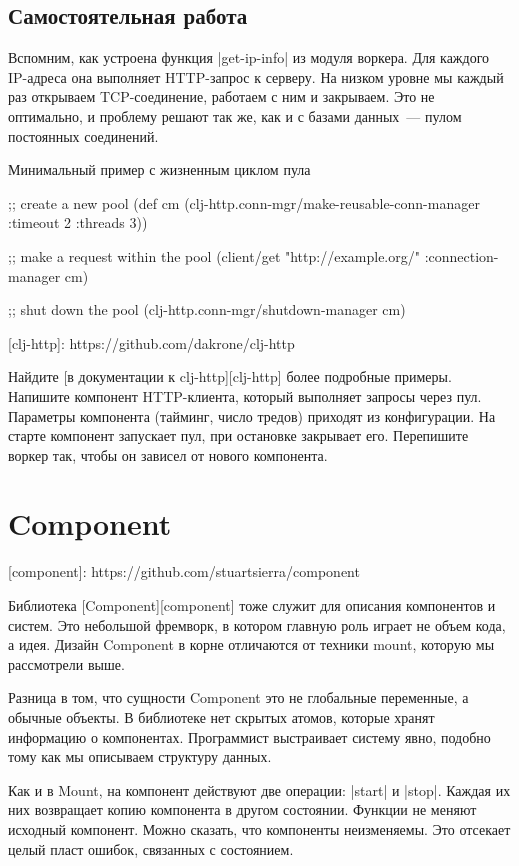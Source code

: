 \subsection{Самостоятельная работа}

Вспомним, как устроена функция \spverb|get-ip-info| из модуля воркера. Для каждого
IP-адреса она выполняет HTTP-запрос к серверу. На низком уровне мы каждый раз
открываем TCP-соединение, работаем с ним и закрываем. Это не оптимально, и
проблему решают так же, как и с базами данных~--- пулом постоянных соединений.

Минимальный пример с жизненным циклом пула

\begin{code}
;; create a new pool
(def cm (clj-http.conn-mgr/make-reusable-conn-manager
         {:timeout 2 :threads 3}))

;; make a request within the pool
(client/get "http://example.org/"
            {:connection-manager cm})

;; shut down the pool
(clj-http.conn-mgr/shutdown-manager cm)
\end{code}

[clj-http]: https://github.com/dakrone/clj-http

Найдите [в документации к clj-http][clj-http] более подробные примеры. Напишите
компонент HTTP-клиента, который выполняет запросы через пул. Параметры
компонента (тайминг, число тредов) приходят из конфигурации. На старте компонент
запускает пул, при остановке закрывает его. Перепишите воркер так, чтобы он
зависел от нового компонента.

\section{Component}

[component]: https://github.com/stuartsierra/component

Библиотека [Component][component] тоже служит для описания компонентов и
систем. Это небольшой фремворк, в котором главную роль играет не объем кода, а
идея. Дизайн Component в корне отличаются от техники mount, которую мы
рассмотрели выше.

Разница в том, что сущности Component это не глобальные переменные, а обычные
объекты. В библиотеке нет скрытых атомов, которые хранят информацию о
компонентах. Программист выстраивает систему явно, подобно тому как мы описываем
структуру данных.

Как и в Mount, на компонент действуют две операции: \spverb|start| и \spverb|stop|. Каждая их
них возвращает копию компонента в другом состоянии. Функции не меняют исходный
компонент. Можно сказать, что компоненты неизменяемы. Это отсекает целый пласт
ошибок, связанных с состоянием.

